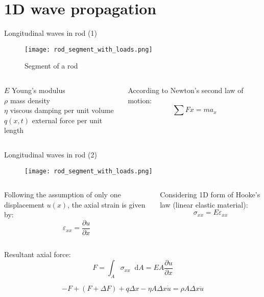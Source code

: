 \documentclass[10pt,aspectratio=169,notes]{beamer} %
\DeclareRobustCommand*{\drv}{\mathop{}\!\mathrm{d}}
\begin{document}
\section{1D wave propagation}
\begin{frame}[t]{Longitudinal waves in rod (1)}
\begin{figure}
\texttt{[image: rod\_segment\_with\_loads.png]}
\caption{Segment of a rod}
\end{figure}
\begin{columns}[T]
	\begin{column}{0.5\textwidth}
		\(E\) Young's modulus\\
		\(\rho\) mass density\\
		\(\eta\) viscous damping per unit volume\\
		\(q(x,t)\) external force per unit length\\
	\end{column}
	\begin{column}{0.5\textwidth}
		According to Newton's second law of motion:
		\begin{equation*}
		\sum Fx = m a_x
		\end{equation*}
	\end{column}
\end{columns}		


\end{frame}
\note{
}
\begin{frame}[t]{Longitudinal waves in rod (2)}
	\begin{figure}
		\texttt{[image: rod\_segment\_with\_loads.png]}
	\end{figure}
\begin{columns}[T]
	\begin{column}{0.5\textwidth}
			Following the assumption of only one displacement \(u(x)\), the axial strain is given by:
		\begin{equation*}
		\varepsilon_{xx}  = \frac{\partial u}{\partial x}
		\end{equation*}
	\end{column}
	\begin{column}{0.5\textwidth}
		Considering 1D form of Hooke's law (linear elastic material):
		\begin{equation*}
		\sigma_{xx} = E \varepsilon_{xx}
		\end{equation*}
	\end{column}
\end{columns}
	Resultant axial force:
	\begin{equation*}
	F=\int_A \sigma_{xx} \drv A = EA \frac{\partial u}{\partial x}
	\end{equation*}
	
	\begin{equation*}
    -F + (F + \Delta F) + q \Delta x - \eta A \Delta x \dot{u} = \rho A \Delta x \ddot{u}
	\end{equation*}
\end{frame}
\end{document}

